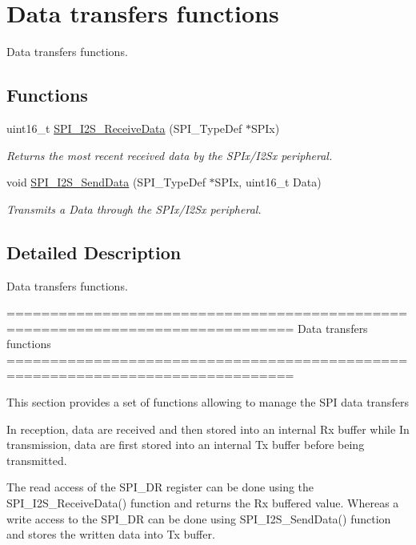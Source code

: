 \hypertarget{group___s_p_i___group2}{\section{Data transfers functions}
\label{group___s_p_i___group2}
}


Data transfers functions.  


\subsection*{Functions}
\begin{DoxyCompactItemize}
\item 
uint16\-\_\-t \hyperlink{group___s_p_i___group2_gab77de76547f3bff403236b263b070a30}{S\-P\-I\-\_\-\-I2\-S\-\_\-\-Receive\-Data} (S\-P\-I\-\_\-\-Type\-Def $\ast$S\-P\-Ix)
\begin{DoxyCompactList}\small\item\em Returns the most recent received data by the S\-P\-Ix/\-I2\-Sx peripheral. \end{DoxyCompactList}\item 
void \hyperlink{group___s_p_i___group2_gad5af40bebe8dbe3fa8bd476489d7e3da}{S\-P\-I\-\_\-\-I2\-S\-\_\-\-Send\-Data} (S\-P\-I\-\_\-\-Type\-Def $\ast$S\-P\-Ix, uint16\-\_\-t Data)
\begin{DoxyCompactList}\small\item\em Transmits a Data through the S\-P\-Ix/\-I2\-Sx peripheral. \end{DoxyCompactList}\end{DoxyCompactItemize}


\subsection{Detailed Description}
Data transfers functions. \begin{DoxyVerb} ===============================================================================
                         Data transfers functions
 ===============================================================================  

  This section provides a set of functions allowing to manage the SPI data transfers
  
  In reception, data are received and then stored into an internal Rx buffer while 
  In transmission, data are first stored into an internal Tx buffer before being 
  transmitted.

  The read access of the SPI_DR register can be done using the SPI_I2S_ReceiveData()
  function and returns the Rx buffered value. Whereas a write access to the SPI_DR 
  can be done using SPI_I2S_SendData() function and stores the written data into 
  Tx buffer.\end{DoxyVerb}
 


